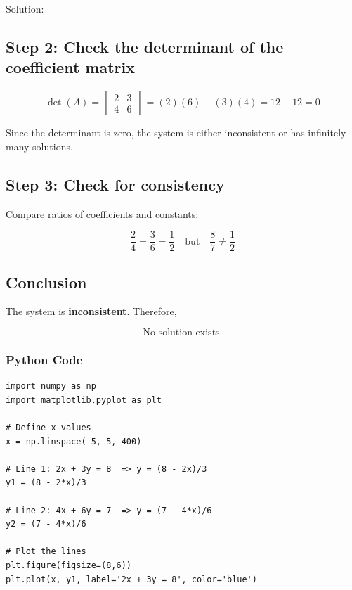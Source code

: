 \documentclass{beamer}
\begin{document}
\begin{frame}{Solution:}
\subsection*{Step 2: Check the determinant of the coefficient matrix}

\begin{equation}
\det(A) = 
\begin{vmatrix} 2 & 3 \\ 4 & 6 \end{vmatrix} 
= (2)(6) - (3)(4) = 12 - 12 = 0
\end{equation}

Since the determinant is zero, the system is either inconsistent or has infinitely many solutions.

\subsection*{Step 3: Check for consistency}

Compare ratios of coefficients and constants:

\begin{equation}
\frac{2}{4} = \frac{3}{6} = \frac{1}{2} 
\quad \text{but} \quad 
\frac{8}{7} \neq \frac{1}{2}
\end{equation}

\subsection*{Conclusion}

The system is \textbf{inconsistent}. Therefore, 

\begin{equation}
\text{No solution exists.}
\end{equation}
\end{frame}


\begin{frame}[fragile]
    \frametitle{Python Code}
    \begin{lstlisting}
import numpy as np
import matplotlib.pyplot as plt

# Define x values
x = np.linspace(-5, 5, 400)

# Line 1: 2x + 3y = 8  => y = (8 - 2x)/3
y1 = (8 - 2*x)/3

# Line 2: 4x + 6y = 7  => y = (7 - 4*x)/6
y2 = (7 - 4*x)/6

# Plot the lines
plt.figure(figsize=(8,6))
plt.plot(x, y1, label='2x + 3y = 8', color='blue')
\end{lstlisting}
\end{frame}
\end{document}
